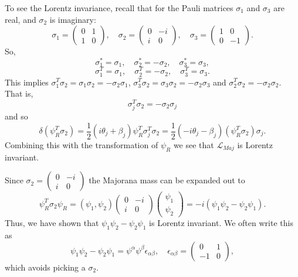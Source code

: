 \documentclass[11pt]{article}
\theoremstyle{definition}
\begin{document}
To see the Lorentz invariance, recall that for the Pauli matrices \(\sigma_1\) and \(\sigma_3\) are real, and \(\sigma_2\) is imaginary:
\begin{equation}
\sigma_1 = \begin{pmatrix} 0 & 1 \\ 1 & 0 \end{pmatrix}, \quad 
\sigma_2 = \begin{pmatrix} 0 & -i \\ i & 0 \end{pmatrix}, \quad 
\sigma_3 = \begin{pmatrix} 1 & 0 \\ 0 & -1 \end{pmatrix}.
\end{equation}
So,
\begin{equation}
\sigma_1^* = \sigma_1, \quad \sigma_2^* = -\sigma_2, \quad \sigma_3^* = \sigma_3,
\end{equation}
\begin{equation}
\sigma_1^T = \sigma_1, \quad \sigma_2^T = -\sigma_2, \quad \sigma_3^T = \sigma_3.
\end{equation}
This implies \(\sigma_1^T \sigma_2 = \sigma_1 \sigma_2 = -\sigma_2 \sigma_1\), \(\sigma_3^T \sigma_2 = \sigma_3 \sigma_2 = -\sigma_2 \sigma_3\) and \(\sigma_2^T \sigma_2 = -\sigma_2 \sigma_2\). That is,
\begin{equation}
\sigma_j^T \sigma_2 = -\sigma_2 \sigma_j
\end{equation}
and so
\begin{equation}
\delta (\psi_R^T \sigma_2) = \frac{1}{2} (i \theta_j + \beta_j) \psi_R^T \sigma_j^T \sigma_2 = \frac{1}{2} (-i \theta_j - \beta_j) (\psi_R^T \sigma_2) \sigma_j.
\end{equation}
Combining this with the transformation of \(\psi_R\) we see that \(\mathcal{L}_{Maj}\) is Lorentz invariant.

Since \(\sigma_2 = \begin{pmatrix} 0 & -i \\ i & 0 \end{pmatrix}\) the Majorana mass can be expanded out to
\begin{equation}
\psi_R^T \sigma_2 \psi_R = (\psi_1, \psi_2) \begin{pmatrix} 0 & -i \\ i & 0 \end{pmatrix} \begin{pmatrix} \psi_1 \\ \psi_2 \end{pmatrix} = -i (\psi_1 \psi_2 - \psi_2 \psi_1).
\end{equation}
Thus, we have shown that \(\psi_1 \psi_2 - \psi_2 \psi_1\) is Lorentz invariant. We often write this as
\begin{equation}
\psi_1 \psi_2 - \psi_2 \psi_1 = \psi^\alpha \psi^\beta \epsilon_{\alpha \beta}, \quad 
\epsilon_{\alpha \beta} = \begin{pmatrix} 0 & 1 \\ -1 & 0 \end{pmatrix},
\end{equation}
which avoids picking a \(\sigma_2\).
\end{document}
